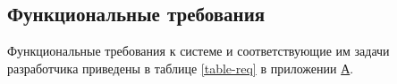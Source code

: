 \subsection{Функциональные требования}

Функциональные требования к системе и соответствующие им задачи разработчика
приведены в таблице \ref{table-req} в приложении \hyperref[appendix-1]{А}.
